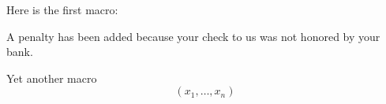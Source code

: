 \documentclass{article}
\def\badcheck{A penalty has been added because your
   check to us was not honored by your bank.\par}
\def\row#1#2{(#1_1,\ldots,#1_#2)}
\begin{document}
Here is the first macro:

\badcheck

Yet another macro
$$
\row xn
$$
\end{document}
